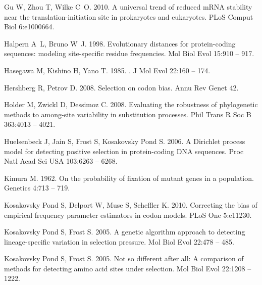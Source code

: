 \documentclass[11pt]{article}
\begin{document}
\begin{thebibliography}{79}
Gu W, Zhou T, Wilke C~O. 2010.
\newblock A universal trend of reduced {mRNA} stability near the
  translation-initiation site in prokaryotes and eukaryotes.
\newblock PLoS Comput Biol 6:e1000664.

Halpern A~L, Bruno W~J. 1998.
\newblock Evolutionary distances for protein-coding sequences: modeling
  site-specific residue frequencies.
\newblock Mol Biol Evol 15:910 -- 917.

Hasegawa M, Kishino H, Yano T. 1985.
.
\newblock J Mol Evol 22:160 -- 174.

Hershberg R, Petrov D. 2008.
\newblock Selection on codon bias.
\newblock Annu Rev Genet 42.

Holder M, Zwickl D, Dessimoz C. 2008.
\newblock Evaluating the robustness of phylogenetic methods to among-site
  variability in substitution processes.
\newblock Phil Trans R Soc B 363:4013 -- 4021.

Huelsenbeck J, Jain S, Frost S, {Kosakovsky Pond} S. 2006.
\newblock A {Dirichlet} process model for detecting positive selection in
  protein-coding {DNA} sequences.
\newblock Proc Natl Acad Sci USA 103:6263 -- 6268.

Kimura M. 1962.
\newblock On the probability of fixation of mutant genes in a population.
\newblock Genetics 4:713 -- 719.

{Kosakovsky Pond} S, Delport W, Muse S, Scheffler K. 2010.
\newblock Correcting the bias of empirical frequency parameter estimators in
  codon models.
\newblock PLoS One 5:e11230.

{Kosakovsky Pond} S, Frost S. 2005{}.
\newblock A genetic algorithm approach to detecting lineage-specific variation
  in selection pressure.
\newblock Mol Biol Evol 22:478 -- 485.

{Kosakovsky Pond} S, Frost S. 2005{}.
\newblock Not so different after all: A comparison of methods for detecting
  amino acid sites under selection.
\newblock Mol Biol Evol 22:1208 -- 1222.


\end{thebibliography}
\end{document}
